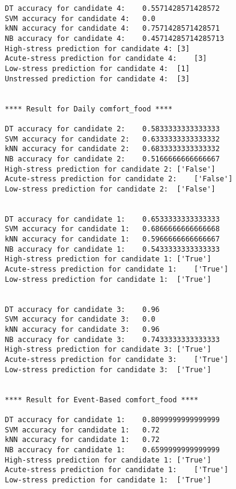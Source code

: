 \begin{lstlisting}
DT accuracy for candidate 4:	0.5571428571428572
SVM accuracy for candidate 4:	0.0
kNN accuracy for candidate 4:	0.7571428571428571
NB accuracy for candidate 4:	0.45714285714285713
High-stress prediction for candidate 4:	[3]
Acute-stress prediction for candidate 4:	[3]
Low-stress prediction for candidate 4:	[1]
Unstressed prediction for candidate 4:	[3]


**** Result for Daily comfort_food ****

DT accuracy for candidate 2:	0.5833333333333333
SVM accuracy for candidate 2:	0.6333333333333332
kNN accuracy for candidate 2:	0.6833333333333332
NB accuracy for candidate 2:	0.5166666666666667
High-stress prediction for candidate 2:	['False']
Acute-stress prediction for candidate 2:	['False']
Low-stress prediction for candidate 2:	['False']


DT accuracy for candidate 1:	0.6533333333333333
SVM accuracy for candidate 1:	0.6866666666666668
kNN accuracy for candidate 1:	0.5966666666666667
NB accuracy for candidate 1:	0.5433333333333333
High-stress prediction for candidate 1:	['True']
Acute-stress prediction for candidate 1:	['True']
Low-stress prediction for candidate 1:	['True']


DT accuracy for candidate 3:	0.96
SVM accuracy for candidate 3:	0.0
kNN accuracy for candidate 3:	0.96
NB accuracy for candidate 3:	0.7433333333333333
High-stress prediction for candidate 3:	['True']
Acute-stress prediction for candidate 3:	['True']
Low-stress prediction for candidate 3:	['True']


**** Result for Event-Based comfort_food ****

DT accuracy for candidate 1:	0.8099999999999999
SVM accuracy for candidate 1:	0.72
kNN accuracy for candidate 1:	0.72
NB accuracy for candidate 1:	0.6599999999999999
High-stress prediction for candidate 1:	['True']
Acute-stress prediction for candidate 1:	['True']
Low-stress prediction for candidate 1:	['True']
\end{lstlisting}

\bigskip
